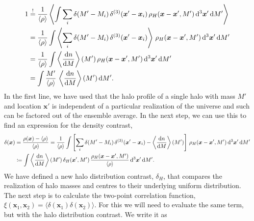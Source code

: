 \documentclass[../main.tex]{subfiles}
\begin{document}
\begin{align}
    1 &\overset{!}{=} \frac{1}{\langle \rho \rangle} \left\langle \int \sum_i \delta(M'-M_i)\,\delta^{(3)}(\boldsymbol{x}'-\boldsymbol{x}_i)\,\rho_H(\boldsymbol{x}-\boldsymbol{x}',M')\, \mathrm{d}^3 \boldsymbol{x}' \, \mathrm{d} M' \right \rangle \\
    &= \frac{1}{\langle \rho \rangle} \int \left\langle \sum_i \delta(M'-M_i)\,\delta^{(3)}(\boldsymbol{x}'-\boldsymbol{x}_i) \right\rangle\,\rho_H(\boldsymbol{x}-\boldsymbol{x}',M')\, \mathrm{d}^3 \boldsymbol{x}' \,\mathrm{d} M' \nonumber\\
    &= \frac{1}{\langle \rho \rangle} \int \left\langle  \frac{\mathrm{d} n}{\mathrm{d} M} \right\rangle(M')\,\rho_H(\boldsymbol{x}-\boldsymbol{x}',M')\, \mathrm{d}^3 \boldsymbol{x}' \,\mathrm{d} M'  \nonumber\\
    &=  \int \frac{M'}{\langle \rho \rangle} \,\left\langle  \frac{\mathrm{d} n}{\mathrm{d} M} \right\rangle(M') \,\mathrm{d} M' .\label{eq:halo_mass_function_normalization}
\end{align} 
In the first line, we have used that the halo profile of a single halo with mass $M'$ and location $\boldsymbol{x}'$ is independent of a particular realization of the universe and such can be factored out of the ensemble average. In the next step, we can use this to find an expression for the density contrast,
\begin{align}
    \label{eq:density-contrast}
    \delta(\boldsymbol{x}) &= \frac{\rho(\boldsymbol{x})-\langle \rho \rangle }{\langle \rho \rangle} = \frac{1}{\langle \rho \rangle} \int \left[  \sum_i \delta(M'-M_i)\,\delta^{(3)}(\boldsymbol{x}'-\boldsymbol{x}_i)-\left\langle  \frac{\mathrm{d} n}{\mathrm{d} M} \right\rangle(M')\right]\,\rho_H(\boldsymbol{x}-\boldsymbol{x}',M')\, \mathrm{d}^3 \boldsymbol{x}' \,\mathrm{d} M'\\
&\coloneqq  \int \left\langle  \frac{\mathrm{d} n}{\mathrm{d} M} \right\rangle(M')\,\delta_H(\boldsymbol{x}',M') \,\frac{\rho_H(\boldsymbol{x}-\boldsymbol{x}',M')}{\langle \rho \rangle}\, \mathrm{d}^3 \boldsymbol{x}' \,\mathrm{d} M'.
\end{align}
We have defined a new halo distribution contrast, $\delta_H$, that compares the realization of halo masses and centres to their underlying uniform distribution. The next step is to calculate the two-point correlation function, $\xi(\boldsymbol{x}_1,\boldsymbol{x}_2) = \langle \delta(\boldsymbol{x}_1) \delta(\boldsymbol{x}_2) \rangle$. For this we will need to evaluate the same term, but with the halo distribution contrast. We write it as
\end{document}
